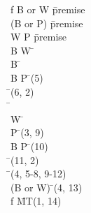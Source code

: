 \documentclass{article}
\begin{document}
\begin{proofbox}
\: f \rightarrow B or W \= \hbox{premise} \\
\: \lnot (B or P) \= \hbox{premise} \\
\: W \rightarrow P \= \hbox{premise} \\
\open
\: B \lor W \= \asm \\
\openAlt
\: B \= \asm \\
\: B \lor P \= \orintro(5) \\
\: \bot \= \bottomintro(6, 2) \\
\: \bot \=  \\
\splitAlt
\: W \= \asm \\
\: P \= \implieselim(3, 9) \\
\: B \lor P \= \orintro(10) \\
\: \bot \= \bottomintro(11, 2) \\
\closeAlt
\: \bot \= \orelim(4, 5-8, 9-12) \\
\close
\: \lnot (B or W) \= \notintro(4, 13) \\
\: \lnot f \= MT(1, 14) \\
\end{proofbox}
\end{document}
